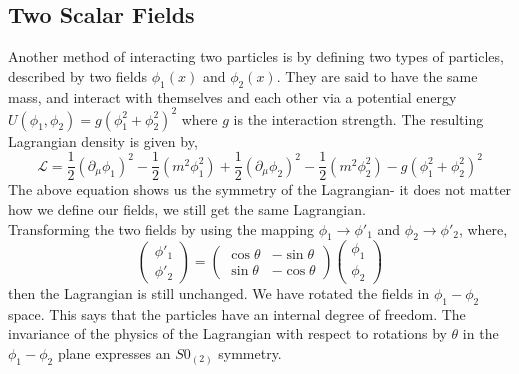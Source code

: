 \subsection{Two Scalar Fields}
Another method of interacting two particles is by defining two types of particles, described by two fields $\phi_1(x)$ and $\phi_2(x)$. They are said to have the same mass, and interact with themselves and each other via a potential energy $U(\phi_1,\phi_2)=g(\phi^2_1+\phi^2_2)^2$ where $g$ is the interaction strength. The resulting Lagrangian density is given by,
\begin{equation}
    \mathcal{L}=\frac{1}{2}(\partial_\mu\phi_1)^2-\frac{1}{2}(m^2\phi^2_1)+\frac{1}{2}(\partial_\mu\phi_2)^2-\frac{1}{2}(m^2\phi^2_2)-g(\phi^2_1+\phi^2_2)^2
\end{equation}
The above equation shows us the symmetry of the Lagrangian- it does not matter how we define our fields, we still get the same Lagrangian.\\
Transforming the two fields by using the mapping $\phi_1\rightarrow \phi'_1$ and  $\phi_2\rightarrow \phi'_2$, where,
\begin{equation}
    \begin{pmatrix}
    \phi'_1\\
    \phi'_2
    \end{pmatrix}=
    \begin{pmatrix}
    \cos{\theta} & -\sin\theta \\
    \sin\theta & -\cos\theta
    \end{pmatrix}
    \begin{pmatrix}
    \phi_1\\
    \phi_2
    \end{pmatrix}
\end{equation}
then the Lagrangian is still unchanged. We have rotated the fields in $\phi_1-\phi_2$ space. This says that the particles have an internal degree of freedom. The invariance of the physics of the Lagrangian with respect to rotations by $\theta$ in the $\phi_1-\phi_2$ plane expresses an $S0_(2)$ symmetry.
